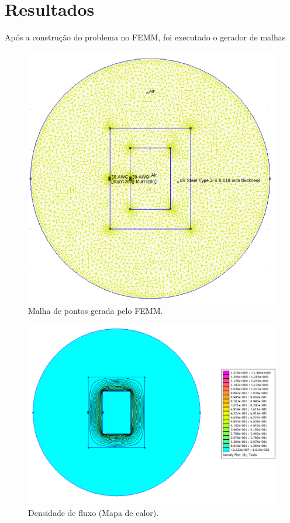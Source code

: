\section{Resultados}
Após a construção do problema no FEMM, foi executado o gerador de malhas
\begin{figure}[H]
\centering
\includegraphics[scale=0.5]{img/assig1/femm_2.png}
\caption[Malha de pontos gerada pelo FEMM]{Malha de pontos gerada pelo FEMM.}
\label{femm2}
\end{figure}

\begin{figure}[H]
\centering
\includegraphics[scale=0.5]{img/assig1/femm_4.png}
\caption[Densidade de fluxo (Mapa de calor)]{Densidade de fluxo (Mapa de calor).}
\label{femm3}
\end{figure}

